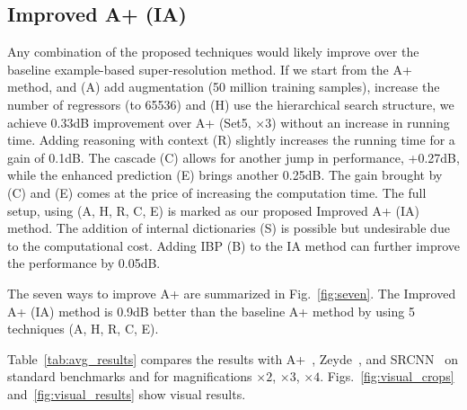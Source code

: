 \documentclass[10pt,twocolumn,letterpaper]{article}
\begin{document}
\subsection{Improved A+ (IA)}
\label{ssc:IA}
Any combination of the proposed techniques would likely improve over the baseline example-based super-resolution method.
If we start from the A+ method, and (A) add augmentation (50 million training samples), increase the number of regressors (to 65536) and (H) use the hierarchical search structure, we achieve 0.33dB improvement over A+ (Set5, $\times3$) without an increase in running time.
Adding reasoning with context (R) slightly increases the running time for a gain of 0.1dB.
The cascade (C) allows for another jump in performance, +0.27dB, while the enhanced prediction (E) brings another 0.25dB. The gain brought by (C) and (E) comes at the price of increasing the computation time. The full setup, using (A, H, R, C, E) is marked as our proposed Improved A+ (IA) method. The addition of internal dictionaries (S) is possible but undesirable due to the computational cost.
Adding IBP (B) to the IA method can further improve the performance by 0.05dB.

The seven ways to improve A+ are summarized in Fig.~\ref{fig:seven}. The Improved A+ (IA) method is 0.9dB better than the baseline A+ method by using 5 techniques (A, H, R, C, E).

Table~\ref{tab:avg_results} compares the results with A+~\cite{Timofte-ACCV-2014}, Zeyde~\cite{Zeyde-CS-2012}, and SRCNN~\cite{Dong-ECCV-2014} on standard benchmarks and for magnifications $\times2$, $\times3$, $\times4$. Figs.~\ref{fig:visual_crops} and~\ref{fig:visual_results} show visual results.
\end{document}
